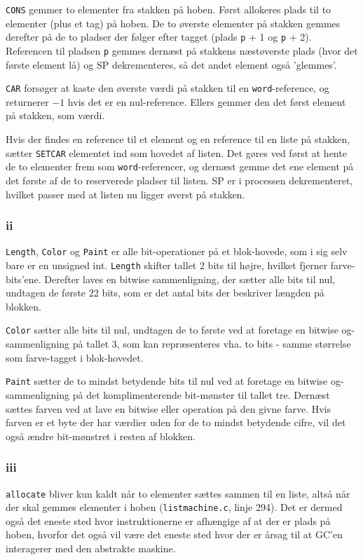 \documentclass{article}
\begin{document}
\texttt{CONS} gemmer to elementer fra stakken på hoben. Først allokeres plads til to elementer (plus et tag) på hoben. De to øverste elementer på stakken gemmes derefter på de to pladser der følger efter tagget (plads \texttt{p} + 1 og \texttt{p} + 2). Referencen til pladsen \texttt{p} gemmes dernæst på stakkens næstøverste plads (hvor det første element lå) og SP dekrementeres, så det andet element også 'glemmes'.

\texttt{CAR} forsøger at kaste den øverste værdi på stakken til en \texttt{word}-reference, og returnerer $-1$ hvis det er en nul-reference. Ellers gemmer den det først element på stakken, som værdi.

Hvis der findes en reference til et element og en reference til en liste på stakken, sætter \texttt{SETCAR} elementet ind som hovedet af listen. Det gøres ved først at hente de to elementer frem som \texttt{word}-referencer, og dernæst gemme det ene element på det første af de to reserverede pladser til listen. SP er i processen dekrementeret, hvilket passer med at listen nu ligger øverst på stakken.

\subsubsection*{ii}
\texttt{Length}, \texttt{Color} og \texttt{Paint} er alle bit-operationer på et blok-hovede, som i sig selv bare er en unsigned int. \texttt{Length} skifter tallet 2 bits til højre, hvilket fjerner farve-bits'ene. Derefter laves en bitwise sammenligning, der sætter alle bits til nul, undtagen de første 22 bits, som er det antal bits der beskriver længden på blokken.

\texttt{Color} sætter alle bits til nul, undtagen de to første ved at foretage en bitwise og-sammenligning på tallet 3, som kan repræsenteres vha. to bits - samme størrelse som farve-tagget i blok-hovedet.

\texttt{Paint} sætter de to mindst betydende bits til nul ved at foretage en bitwise og-sammenligning på det komplimenterende bit-mønster til tallet tre. Dernæst sættes farven ved at lave en bitwise eller operation på den givne farve. Hvis farven er et byte der har værdier uden for de to mindst betydende cifre, vil det også ændre bit-mønstret i resten af blokken.

\subsubsection*{iii}
\texttt{allocate} bliver kun kaldt når to elementer sættes sammen til en liste, altså når der skal gemmes elementer i hoben (\texttt{listmachine.c}, linje 294). Det er dermed også det eneste sted hvor instruktionerne er afhængige af at der er plads på hoben, hvorfor det også vil være det eneste sted hvor der er årsag til at GC'en interagerer med den abstrakte maskine.
\end{document}
